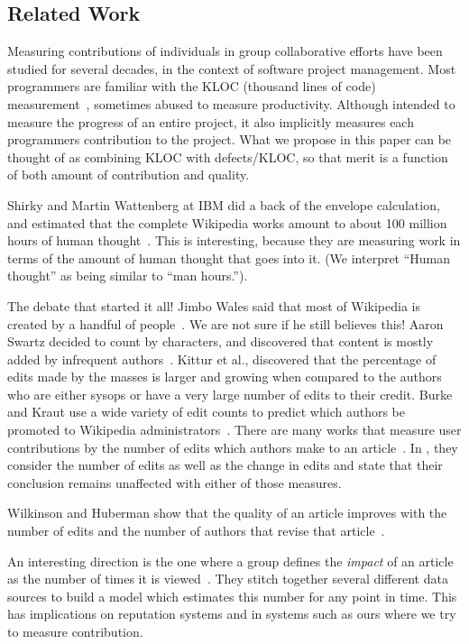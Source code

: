 \subsection{Related Work}

Measuring contributions of individuals in group collaborative
efforts have been studied for several decades, in the context of
software project management.
Most programmers are familiar with the KLOC (thousand lines of 
code) measurement~\cite{Schultz1988,Park1992},
sometimes abused to measure productivity.
Although intended to measure the progress of an
entire project, it also implicitly 
measures each programmers contribution to the project.
What we propose in this paper can be thought of as combining
KLOC with defects/KLOC, so that merit is a function of both
amount of contribution and quality.

Shirky and Martin Wattenberg at IBM did a back of the
envelope calculation, and estimated that the complete Wikipedia
works amount to about 100 million hours of human
thought~\cite{Shirky2008}.
This is interesting, because they are measuring work
in terms of the amount of human thought that goes into it.
(We interpret ``Human thought'' as being similar 
to ``man hours.'').

The debate that started it all!
Jimbo Wales said that most of Wikipedia is created by
a handful of people~\cite{Wales2005}.
We are not sure if he still believes this!
Aaron Swartz decided to count by characters,
and discovered that content is mostly added
by infrequent authors~\cite{Swartz2006}.
Kittur et al., \cite{Kittur2007} discovered that the
percentage of edits made by the masses is larger and growing 
when compared to the authors who are either sysops or have a 
very large number of edits to their credit.
Burke and Kraut use a wide variety of edit counts to predict
which authors be promoted to Wikipedia 
administrators~\cite{AdministratorMop2008}.
There are many works that measure user contributions by the
number of edits which authors make to an 
article~\cite{Wales2005,EditsEqQuality2007,Kittur2007,
Suh2008,OrtegaBarahona2007,Stein2007}.
In \cite{Kittur2007}, they consider the number of edits
as well as the change in edits and state that their conclusion
remains unaffected with either of those measures.

Wilkinson and Huberman show that the quality of an article improves
with the number of edits and the number of authors that revise
that article~\cite{EditsEqQuality2007}.

An interesting direction is the one where a group defines the 
\textit{impact} of an article as the number of times it is 
viewed~\cite{WikiImpact2007}. 
They stitch together several different data sources to build a model 
which estimates this number for any point in time.
This has implications on reputation systems and in systems such as
ours where we try to measure contribution.

